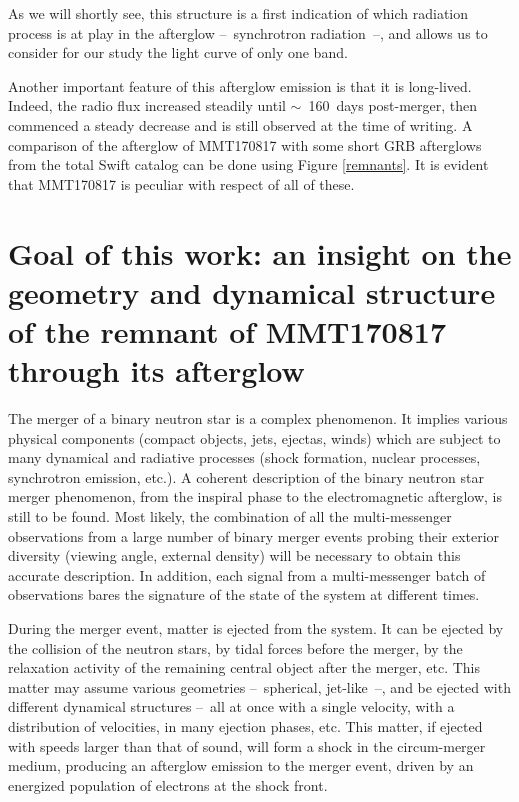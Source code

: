 As we will shortly see, this structure is a first indication of which radiation process is at play in the afterglow --~synchrotron radiation~--, and allows us to consider for our study the light curve of only one band.


Another important feature of this afterglow emission is that it is long-lived. Indeed, the radio flux increased steadily until $\sim$~160~days post-merger, then commenced a steady decrease and is still observed at the time of writing. A comparison of the afterglow of MMT170817 with some short GRB afterglows from the total Swift catalog can be done using Figure \ref{remnants}. It is evident that MMT170817 is peculiar with respect of all of these.


\section{Goal of this work: an insight on the geometry and dynamical structure of the remnant of MMT170817 through its afterglow}

The merger of a binary neutron star is a complex phenomenon. It implies various physical components (compact objects, jets, ejectas, winds) which are subject to many dynamical and radiative processes (shock formation, nuclear processes, synchrotron emission, etc.). A coherent description of the binary neutron star merger phenomenon, from the inspiral phase to the electromagnetic afterglow, is still to be found. Most likely, the combination of all the multi-messenger observations from a large number of binary merger events probing their exterior diversity (viewing angle, external density) will be necessary to obtain this accurate description. In addition, each signal from a multi-messenger batch of observations bares the signature of the state of the system at different times.

During the merger event, matter is ejected from the system. It can be ejected by the collision of the neutron stars, by tidal forces before the merger, by the relaxation activity of the remaining central object after the merger, etc. This matter may assume various geometries --~spherical, jet-like~--, and be ejected with different dynamical structures --~all at once with a single velocity, with a distribution of velocities, in many ejection phases, etc. This matter, if ejected with speeds larger than that of sound, will form a shock in the circum-merger medium, producing an afterglow emission to the merger event, driven by an energized population of electrons at the shock front.

